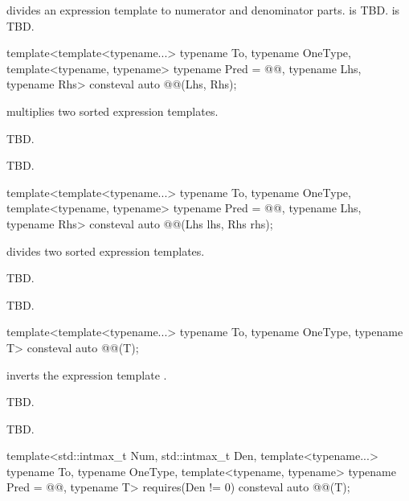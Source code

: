 \pnum
{} divides an expression template to numerator and denominator parts.
 is TBD.
 is TBD.

\begin{itemdecl}
template<template<typename...> typename To, typename OneType,
         template<typename, typename> typename Pred = @@, typename Lhs, typename Rhs>
consteval auto @@(Lhs, Rhs);
\end{itemdecl}

\begin{itemdescr}
\pnum
{} multiplies two sorted expression templates.

\pnum
\effects
TBD.

\pnum
\returns
TBD.
\end{itemdescr}

\begin{itemdecl}
template<template<typename...> typename To, typename OneType,
         template<typename, typename> typename Pred = @@, typename Lhs, typename Rhs>
consteval auto @@(Lhs lhs, Rhs rhs);
\end{itemdecl}

\begin{itemdescr}
\pnum
{} divides two sorted expression templates.

\pnum
\effects
TBD.

\pnum
\returns
TBD.
\end{itemdescr}

\begin{itemdecl}
template<template<typename...> typename To, typename OneType, typename T>
consteval auto @@(T);
\end{itemdecl}

\begin{itemdescr}
\pnum
{} inverts the expression template .

\pnum
\effects
TBD.

\pnum
\returns
TBD.
\end{itemdescr}

\begin{itemdecl}
template<std::intmax_t Num, std::intmax_t Den, template<typename...> typename To,
         typename OneType, template<typename, typename> typename Pred = @@, typename T>
  requires(Den != 0)
consteval auto @@(T);
\end{itemdecl}

